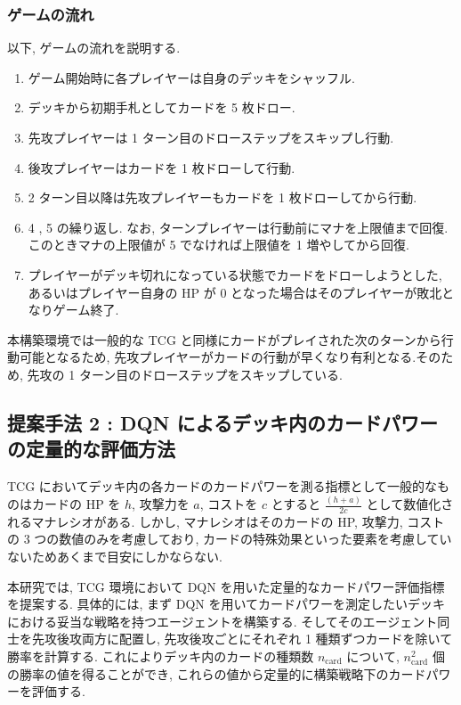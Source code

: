 \documentclass[12pt]{jarticle}
\begin{document}
\subsubsection{ゲームの流れ}
以下, ゲームの流れを説明する.
\begin{enumerate}
  \setlength{\itemsep}{0cm} %
  \item ゲーム開始時に各プレイヤーは自身のデッキをシャッフル.
  \item デッキから初期手札としてカードを 5 枚ドロー. 
  \item 先攻プレイヤーは 1 ターン目のドローステップをスキップし行動.
  \item 後攻プレイヤーはカードを 1 枚ドローして行動.
  \item 2 ターン目以降は先攻プレイヤーもカードを 1 枚ドローしてから行動. 
  \item 4 , 5 の繰り返し. なお, ターンプレイヤーは行動前にマナを上限値まで回復. このときマナの上限値が 5 でなければ上限値を 1 増やしてから回復.
  \item プレイヤーがデッキ切れになっている状態でカードをドローしようとした, あるいはプレイヤー自身の HP が 0 となった場合はそのプレイヤーが敗北となりゲーム終了.
\end{enumerate}
\par
本構築環境では一般的な TCG と同様にカードがプレイされた次のターンから行動可能となるため, 先攻プレイヤーがカードの行動が早くなり有利となる.そのため, 先攻の 1 ターン目のドローステップをスキップしている. 



\subsection{提案手法 2 : DQN によるデッキ内のカードパワーの定量的な評価方法}
\label{manaratio}
TCG においてデッキ内の各カードのカードパワーを測る指標として一般的なものはカードの HP を $h$, 攻撃力を $a$, コストを $c$ とすると $\frac{(h + a)}{2c} $ として数値化されるマナレシオがある. 
しかし, マナレシオはそのカードの HP, 攻撃力, コストの 3 つの数値のみを考慮しており, カードの特殊効果といった要素を考慮していないためあくまで目安にしかならない. \par
本研究では, TCG 環境において DQN を用いた定量的なカードパワー評価指標を提案する.
具体的には, まず DQN を用いてカードパワーを測定したいデッキにおける妥当な戦略を持つエージェントを構築する. 
そしてそのエージェント同士を先攻後攻両方に配置し, 先攻後攻ごとにそれぞれ 1 種類ずつカードを除いて勝率を計算する. これによりデッキ内のカードの種類数 $n_{\mathrm{card}}$ について, $n_{\mathrm{card}}^2$ 個の勝率の値を得ることができ, これらの値から定量的に構築戦略下のカードパワーを評価する. 
\end{document}
